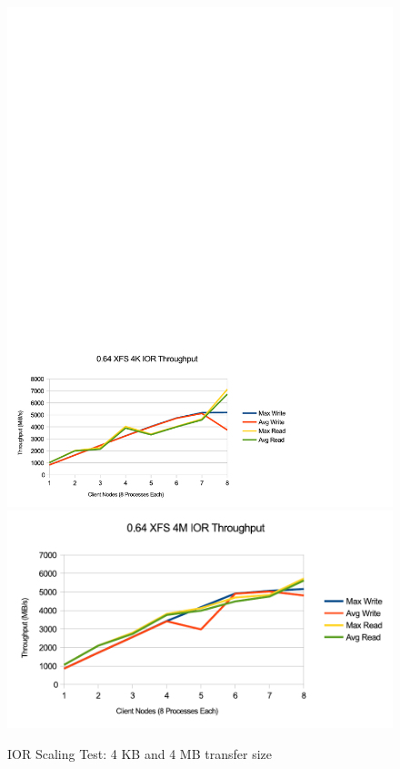 \documentclass{article}
\begin{document}

\begin{figure}[htb]
\centering
\includegraphics[width=5in]{ior-064-4k}
\includegraphics[width=5in]{ior-064-4m}
\caption{IOR Scaling Test: 4 KB and 4 MB transfer size}
\label{fig:ior-064}
\end{figure}
\end{document}
